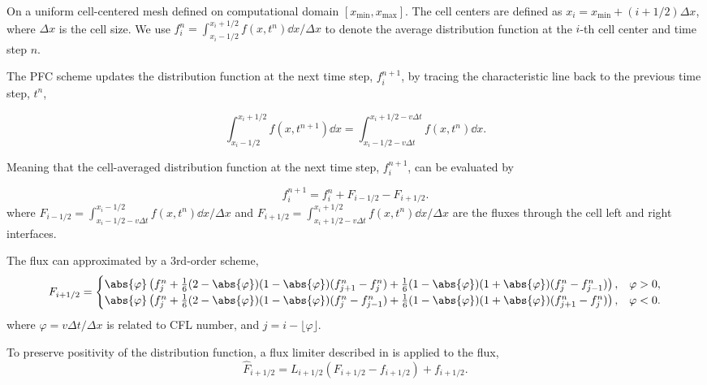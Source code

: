 On a uniform cell-centered mesh defined on computational domain $[x_{\text{min}}, x_{\text{max}}]$. The cell centers are defined as $x_i = x_{\text{min}} + (i+1/2)\Delta x$, where $\Delta x$ is the cell size. We use $f_i^n=\int_{x_i-1/2}^{x_i+1/2} f(x,t^n)\dd x/\Delta x$ to denote the average distribution function at the $i$-th cell center and time step $n$.

The PFC scheme updates the distribution function at the next time step, $f_i^{n+1}$, by tracing the characteristic line back to the previous time step, $t^n$,

\begin{equation}
	\int_{x_i-1/2}^{x_i+1/2} f(x, t^{n+1}) \dd x = \int_{x_i-1/2 - v\Delta t}^{x_i+1/2 - v\Delta t} f(x, t^n) \dd x.
	\label{eq:trace_characteristic}
\end{equation}

Meaning that the cell-averaged distribution function at the next time step, $f_i^{n+1}$, can be evaluated by

\begin{equation}
	f_i^{n+1} = f_i^n + F_{i-1/2} - F_{i+1/2}.
	\label{eq:distribution_update}
\end{equation}
where $F_{i-1/2} = \int_{x_i-1/2 - v\Delta t}^{x_i-1/2} f(x, t^n) \dd x/\Delta x$ and $F_{i+1/2}=\int_{x_i+1/2 - v\Delta t}^{x_i+1/2} f(x, t^n) \dd x/\Delta x$ are the fluxes through the cell left and right interfaces.

The flux can approximated by a 3rd-order scheme,
\begin{equation}
	F_{i+1/2} = \begin{cases}
		\abs{\varphi}\left( f_{j}^n + \frac{1}{6}(2 - \abs{\varphi})(1-\abs{\varphi})(f_{j+1}^n - f_{j}^n) + \frac{1}{6}(1 - \abs{\varphi})(1+\abs{\varphi})(f_{j}^n - f_{j-1}^n)\right), & \varphi > 0, \\
		\abs{\varphi}\left( f_{j}^n + \frac{1}{6}(2 - \abs{\varphi})(1-\abs{\varphi})(f_{j}^n - f_{j-1}^n) + \frac{1}{6}(1 - \abs{\varphi})(1+\abs{\varphi})(f_{j+1}^n - f_{j}^n)\right), & \varphi < 0.
	\end{cases}
	\label{eq:flux_3rd_order}
\end{equation}
where $\varphi = v\Delta t/\Delta x$ is related to CFL number, and $j = i - \lfloor\varphi\rfloor$.

To preserve positivity of the distribution function, a flux limiter described in \cite{liu2021conservative} is applied to the flux,
\begin{equation}
	\hat{F}_{i+1/2} = L_{i+1/2} \left( F_{i+1/2} - f_{i+1/2} \right) + f_{i+1/2}.
	\label{eq:modified_flux}
\end{equation}

